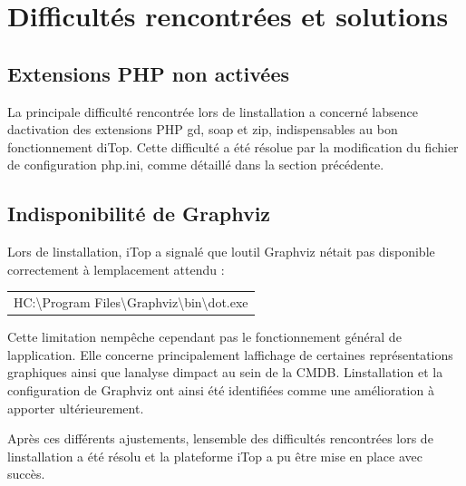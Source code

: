 \chapter{Difficultés rencontrées et solutions}
\minitoc
\newpage


\section{Extensions PHP non activées}

La principale difficulté rencontrée lors de l\textquotesingle installation a concerné l\textquotesingle absence d\textquotesingle activation des extensions PHP gd, soap et zip, indispensables au bon fonctionnement d\textquotesingle iTop. Cette difficulté a été résolue par la modification du fichier de configuration php.ini, comme détaillé dans la section précédente.

\section{Indisponibilité de Graphviz}

Lors de l\textquotesingle installation, iTop a signalé que l\textquotesingle outil Graphviz n\textquotesingle était pas disponible correctement à l\textquotesingle emplacement attendu :

\begin{longtable}[]{@{}
  >{\raggedright\arraybackslash}p{}@{}}
\toprule\noalign{}
\endhead
\bottomrule\noalign{}
\endlastfoot
HC:\textbackslash Program Files\textbackslash Graphviz\textbackslash bin\textbackslash dot.exe \\
\end{longtable}

Cette limitation n\textquotesingle empêche cependant pas le fonctionnement général de l\textquotesingle application. Elle concerne principalement l\textquotesingle affichage de certaines représentations graphiques ainsi que l\textquotesingle analyse d\textquotesingle impact au sein de la CMDB. L\textquotesingle installation et la configuration de Graphviz ont ainsi été identifiées comme une amélioration à apporter ultérieurement.

Après ces différents ajustements, l\textquotesingle ensemble des difficultés rencontrées lors de l\textquotesingle installation a été résolu et la plateforme iTop a pu être mise en place avec succès.


